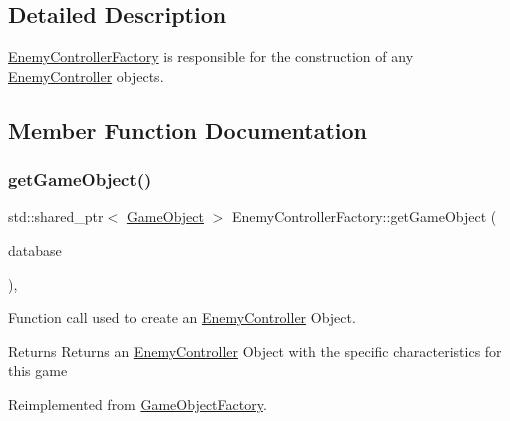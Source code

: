 \subsection{Detailed Description}
\hyperlink{class_enemy_controller_factory}{Enemy\+Controller\+Factory} is responsible for the construction of any \hyperlink{class_enemy_controller}{Enemy\+Controller} objects. 

\subsection{Member Function Documentation}
\mbox{\label{class_enemy_controller_factory_a6ab6c433cc498c7353a1ab2eb213664d}} 
\subsubsection{\texorpdfstring{get\+Game\+Object()}{getGameObject()}}
{\footnotesize\ttfamily std\+::shared\+\_\+ptr$<$ \hyperlink{class_game_object}{Game\+Object} $>$ Enemy\+Controller\+Factory\+::get\+Game\+Object (\begin{DoxyParamCaption}\item[{const std\+::shared\+\_\+ptr$<$ \hyperlink{class_database_interface}{Database\+Interface} $>$ \&}]{database }\end{DoxyParamCaption})\hspace{0.3cm}{\ttfamily [override]}, {\ttfamily [virtual]}}



Function call used to create an \hyperlink{class_enemy_controller}{Enemy\+Controller} Object. 

\begin{DoxyReturn}{Returns}
Returns an \hyperlink{class_enemy_controller}{Enemy\+Controller} Object with the specific characteristics for this game 
\end{DoxyReturn}


Reimplemented from \hyperlink{class_game_object_factory_a5b684a6e77fb82c041f1721eb07c553d}{Game\+Object\+Factory}.

\mbox{\label{class_enemy_controller_factory_a27d4819c1174490c22f2e111f32ca2ec}} 
